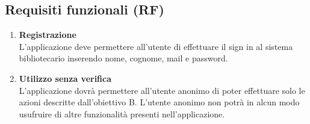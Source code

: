 \documentclass{article}
\begin{document}
\subsection{Requisiti funzionali (RF)}\label{sec:RF}
    \begin{enumerate}
    \subsubsection{Utente Anonimo}
        \item \textbf{Registrazione}\label{sec:RF1}\\
        L’applicazione deve permettere all’utente di effettuare il sign in al sistema bibliotecario inserendo nome, cognome, mail e password.
        \item \textbf{Utilizzo senza verifica}\label{sec:RF2}\\
        L’applicazione dovrà permettere all’utente anonimo di poter effettuare solo le azioni descritte dall’obiettivo B. L’utente anonimo non potrà in alcun modo usufruire di altre funzionalità presenti nell'applicazione.

\end{enumerate}
\end{document}
